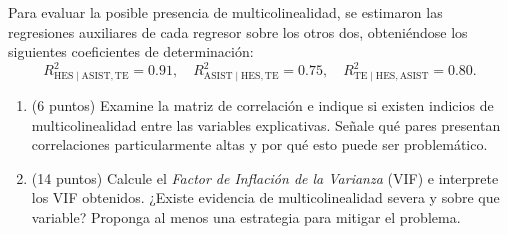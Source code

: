 \documentclass[10pt,a4paper]{article}
\begin{document}
Para evaluar la posible presencia de multicolinealidad, se estimaron las regresiones auxiliares de cada regresor sobre los otros dos, obteniéndose los siguientes coeficientes de determinación:
\[
R^2_{\text{HES}\mid \text{ASIST},\text{TE}} = 0.91,\quad
R^2_{\text{ASIST}\mid \text{HES},\text{TE}} = 0.75,\quad
R^2_{\text{TE}\mid \text{HES},\text{ASIST}} = 0.80.
\]
\begin{enumerate}
  \item (6 puntos) Examine la matriz de correlación e indique si existen indicios de multicolinealidad entre las variables explicativas. Señale qué pares presentan correlaciones particularmente altas y por qué esto puede ser problemático.\\

  
  \item (14 puntos) Calcule el \textit{Factor de Inflación de la Varianza} (VIF) e interprete los VIF obtenidos. ¿Existe evidencia de multicolinealidad severa y sobre que variable? Proponga al menos una estrategia para mitigar el problema.\\

 \end{enumerate}
\newpage
\end{document}
